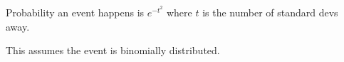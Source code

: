\documentclass[12pt]{article}
\begin{document}
Probability an event happens is $e^{-t^2}$ where $t$ is the number
of standard devs away. 

This assumes the event is binomially distributed.
\end{document}
